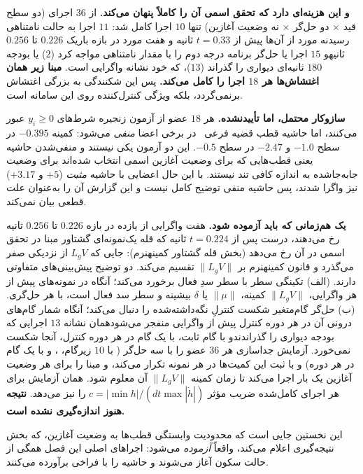 \documentclass[10pt,twocolumn]{article}
\newcommand{\en}[1]{\lr{#1}}
\newcommand{\md}{\lr{\textemdash}}
\newcommand{\nd}{\lr{\textendash}}
\begin{document}
\textbf{و این هزینه‌ای دارد که تحقق اسمی آن را کاملاً پنهان می‌کند.} از $36$ اجرای
\en{ECBF} (دو سطح قید $\times$ دو حل‌گر $\times$ نه وضعیت آغازین) تنها $10$ اجرا
کامل شد: $11$ اجرا به حالت نامتناهی رسید\md{}نه مورد از آن‌ها پیش از $t=0.33$ ثانیه
و هفت مورد در بازه باریک $0.226$ تا $0.256$ ثانیه\md{}و $15$ اجرا یا حل‌گر برنامه
درجه دوم را با مقدار نامتناهی مواجه کرد ($2$) یا بودجه $180$ ثانیه‌ای دیواری را
گذراند ($13$)، که خود نشانه واگرایی است. \textbf{مبنا زیر همان اغتشاش‌ها هر $18$
اجرا را کامل می‌کند.} پس این شکنندگی به بزرگی اغتشاش برنمی‌گردد، بلکه ویژگی
کنترل‌کننده \en{ECBF} روی این سامانه است.

\textbf{سازوکار محتمل، اما تأییدنشده.} هر $18$ عضو از آزمون زنجیره شرط‌های
$y_i\ge0$ عبور می‌کنند، اما حاشیه قطب قضیه فرعی~\en{5.2} در
برخی اعضا \emph{منفی} می‌شود: کمینه $-0.395$ در سطح $-1.0$ و $-2.47$ در سطح $-0.5$.
این دو آزمون یکی نیستند و منفی‌شدن حاشیه یعنی قطب‌هایی که برای وضعیت آغازین اسمی
انتخاب شده‌اند برای وضعیت جابه‌جاشده به اندازه کافی تند نیستند. با این حال اعضایی با
حاشیه \emph{مثبت} ($+5$ و $+3.17$) نیز واگرا شدند، پس حاشیه منفی توضیح کامل نیست و
این گزارش آن را به‌عنوان علت قطعی بیان نمی‌کند.

\textbf{یک هم‌زمانی که باید آزموده شود.} هفت واگرایی از یازده در بازه $0.226$ تا $0.256$
ثانیه رخ می‌دهند، درست پس از $t=0.224$ ثانیه که قله یک‌نمونه‌ای گشتاور مبنا در تحقق اسمی
در آن رخ می‌دهد (بخش قله گشتاور کمینه\nd{}نرم): جایی که $L_gV$ از نزدیکی صفر می‌گذرد و قانون
کمینه\nd{}نرم بر $\|L_gV\|$ تقسیم می‌کند. دو توضیح پیش‌بینی‌های متفاوتی دارند. (الف) تکینگی
سطر \en{CLF} با سطر سدِ فعال برخورد می‌کند؛ آنگاه در نمونه‌های پیش از هر واگرایی، $\|L_gV\|$
کمینه، $\|\mu\|$ یا $\delta$ بیشینه و سطر سد فعال است، با هر حل‌گری. (ب) حل‌گر گام‌متغیر
\en{ode45} شکست کنترلِ نگه‌داشته‌شده را دنبال می‌کند؛ آنگاه شمار گام‌های درونی آن در هر دوره
کنترل پیش از واگرایی منفجر می‌شود\md{}همان نشانه $13$ اجرایی که بودجه دیواری را
گذراندند\md{}و \en{rk4} با گام ثابت، با یک گام در هر دوره کنترل، آنجا شکست نمی‌خورد. آزمایش
جداسازی هر $36$ عضو را با سه حل‌گر (\en{rk4} با $10$ زیرگام، \en{ode45}، و \en{rk4} با یک
گام در هر دوره) و با ثبت این کمیت‌ها در هر نمونه تکرار می‌کند، و مبنا را برای هر وضعیت
آغازین یک بار اجرا می‌کند تا زمان کمینه $\|L_gV\|$ آن معلوم شود. همان آزمایش برای هر اجرای
کامل‌شده \en{ECBF} ضریب مؤثر $c=|\min h|/(dt\max|\dot h|)$ را نیز می‌دهد. \textbf{نتیجه
هنوز اندازه‌گیری نشده است.}

این نخستین جایی است که محدودیت وابستگی قطب‌ها به وضعیت آغازین، که بخش نتیجه‌گیری
اعلام می‌کند، واقعاً \emph{آزموده} می‌شود: اجراهای اصلی این فصل همگی از حالت سکون
آغاز می‌شوند و حاشیه را با فراخی برآورده می‌کنند.
\end{document}
